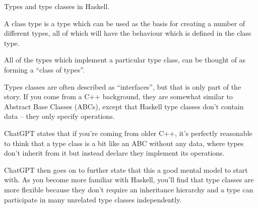 \begin{frame}[t, fragile]{Types and type classes in Haskell.}

A class type is a type which can be used as the basis for creating a
number of different types, all of which will have the behaviour which is
defined in the class type.

All of the types which implement a particular type class, can be thought
of as forming a ``class of types''.

Types classes are often described as ``interfaces'', but that is only part of the story. If you come from a C++ background,
they are somewhat similar to Abstract Base Classes (ABCs), except that Haskell type classes don't contain data -- they only specify operations.

ChatGPT states that if you're coming from older C++, it's perfectly reasonable to think that a type class is a bit like
an ABC without any data, where types don't inherit from it but instead declare they implement its operations.

ChatGPT then goes on to further state that this a good mental model to start with. As you become more familiar with Haskell, you'll find that type classes are more flexible because they don't require an inheritance hierarchy and a type can participate in many unrelated type classes independently.

\end{frame}